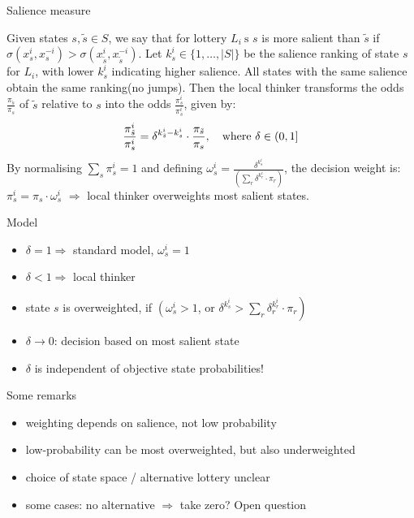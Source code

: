\begin{frame}{Salience measure}
\footnotesize
    \begin{definition}
        Given states $s, \tilde{s} \in S$, we say that for lottery $L_i \mathrm{~s}$ $s$ is more salient than $\tilde{s}$ if $\sigma\left(x_s^i, x_s^{-i}\right)>\sigma\left(x_{\tilde{s}}^i, x_{\tilde{s}}^{-i}\right)$.
        Let $k_s^i \in\{1, \ldots,|S|\}$ be the salience ranking of state $s$ for $L_i$, with lower $k_s^i$ indicating higher salience.
        All states with the same salience obtain the same ranking(no jumps). Then the local thinker transforms the odds $\frac{\pi_{\tilde{s}}}{\pi_s}$ of $\tilde{s}$ relative to $s$ into the odds $\frac{\pi_s^i}{\pi_s^i}$, given by:
        \[
        \frac{\pi_{\tilde{s}}^i}{\pi_s^i}=\delta^{k_{\tilde{s}}^i-k_s^i} \cdot \frac{\pi_{\tilde{s}}}{\pi_s}, \text{\quad where } \delta \in(0,1]
        \]
        By normalising $\sum_s \pi_s^i=1$ and defining $\omega_s^i=\frac{\delta^{k_s^i}}{\left(\sum_r \delta^{k_r^i} \cdot \pi_r\right)}$, the decision weight is: $\pi_s^i=\pi_s \cdot \omega_s^i$
        $\Rightarrow$ local thinker overweights most salient states.
    \end{definition}
\end{frame}

\begin{frame}{Model}
    \begin{itemize}
        \item $\delta=1 \Rightarrow$ standard model, $\omega_s^i=1$\medskip
        \item $\delta<1 \Rightarrow$ local thinker\medskip
        \item state $s$ is overweighted, if $\left(\omega_s^i>1\right.$, or $\left.\delta^{k_s^i}>\sum_r \delta_r^{k_r^i} \cdot \pi_r\right)$\medskip
        \item $\delta \rightarrow 0$: decision based on most salient state\medskip
        \item $\delta$ is independent of objective state probabilities!\medskip
    \end{itemize}
\end{frame}

\begin{frame}{Some remarks}
    \begin{itemize}
        \item weighting depends on salience, not low probability\medskip
        \item low-probability can be most overweighted, but also underweighted\medskip
        \item choice of state space / alternative lottery unclear\medskip
        \item some cases: no alternative $\Rightarrow$ take zero? Open question\medskip
    \end{itemize}
\end{frame}

